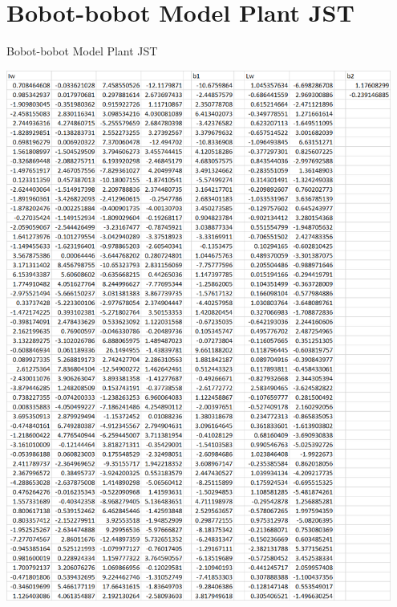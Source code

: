 \section{Bobot-bobot Model Plant JST}
\begin{table}[!h]
	\caption{Bobot-bobot Model Plant JST}
	\label{tbl:A:BobotPlant}
	\centering
	\includegraphics[width=0.95\textwidth]{figures/BobotPlant}
\end{table}
\vspace{2em}

